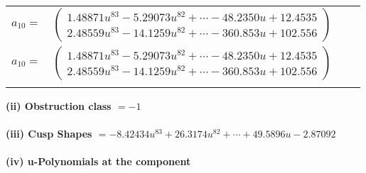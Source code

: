 \documentclass[1p]{elsarticle_modified}
\theoremstyle{definition}
\begin{document}
\begin{tabular}{m{7pt} m{180pt} m{7pt} m{180pt} }
\flushright $a_{10}=$&$\begin{pmatrix}1.48871 u^{83}-5.29073 u^{82}+\cdots-48.2350 u+12.4535\\2.48559 u^{83}-14.1259 u^{82}+\cdots-360.853 u+102.556\end{pmatrix}$\\ \flushright $a_{10}=$&$\begin{pmatrix}1.48871 u^{83}-5.29073 u^{82}+\cdots-48.2350 u+12.4535\\2.48559 u^{83}-14.1259 u^{82}+\cdots-360.853 u+102.556\end{pmatrix}$\\&\end{tabular}
\flushleft \textbf{(ii) Obstruction class $= -1$}\\~\\
\flushleft \textbf{(iii) Cusp Shapes $= -8.42434 u^{83}+26.3174 u^{82}+\cdots+49.5896 u-2.87092$}\\~\\
\newpage\renewcommand{\arraystretch}{1}
\flushleft \textbf{(iv) u-Polynomials at the component}\newline \\
\end{document}
